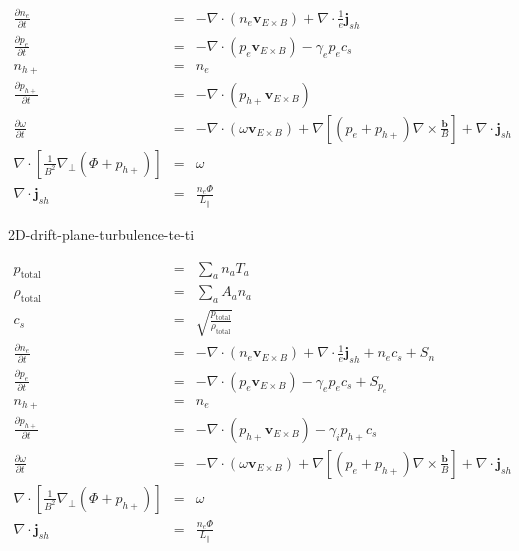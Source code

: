 \begin{eqnarray}
\frac{\partial n_e}{\partial t} &=& - \nabla\cdot\left(n_e\mathbf{v}_{E\times 
B}\right) + \nabla\cdot{\frac{1}{e}\mathbf{j}_{sh}} \\ \frac{\partial 
p_e}{\partial t} &=& - \nabla\cdot\left(p_e\mathbf{v}_{E\times B}\right) - 
\gamma_e p_e c_s \\ n_{h+} &=& n_e \\ \frac{\partial p_{h+}}{\partial t} &=& - 
\nabla\cdot\left(p_{h+}\mathbf{v}_{E\times B}\right) \\ \frac{\partial 
\omega}{\partial t} &=& - \nabla\cdot\left(\omega\mathbf{v}_{E\times B}\right) 
+ \nabla\left[\left(p_e + p_{h+}\right)\nabla\times\frac{\mathbf{b}}{B}\right] 
+ \nabla\cdot\mathbf{j}_{sh} \\ 
\nabla\cdot\left[\frac{1}{B^2}\nabla_\perp\left(\Phi + p_{h+}\right)\right] &=& 
\omega \\ \nabla\cdot{\mathbf{j}_{sh}} &=& \frac{n_e\Phi}{L_{\|}}
\end{eqnarray}

2D-drift-plane-turbulence-te-ti

\begin{eqnarray}
p_\mathrm{total} &=& \sum_a n_a T_a \\ \rho_\mathrm{total} &=& \sum_a A_a n_a \\
c_s &=& \sqrt{\frac{p_\mathrm{total}}{\rho_\mathrm{total}}} \\ 
\frac{\partial n_e}{\partial t} &=& - \nabla\cdot\left(n_e\mathbf{v}_{E\times 
B}\right) + \nabla\cdot{\frac{1}{e}\mathbf{j}_{sh}} + n_e c_s + S_n \\ 
\frac{\partial p_e}{\partial t} &=& - \nabla\cdot\left(p_e\mathbf{v}_{E\times 
B}\right) - \gamma_e p_e c_s + S_{p_e} \\
n_{h+} &=& n_e \\
\frac{\partial p_{h+}}{\partial t} &=& - \nabla\cdot\left(p_{h+}\mathbf{v}_{E\times B}\right) 
- \gamma_i p_{h+} c_s \\
\frac{\partial \omega}{\partial t} &=& 
-\nabla\cdot\left(\omega\mathbf{v}_{E\times B}\right) + \nabla\left[\left(p_e + 
p_{h+}\right)\nabla\times\frac{\mathbf{b}}{B}\right] + \nabla\cdot\mathbf{j}_{sh} \\ 
\nabla\cdot\left[\frac{1}{B^2}\nabla_\perp\left(\Phi + p_{h+}\right)\right] &=& \omega \\
\nabla\cdot{\mathbf{j}_{sh}} &=& \frac{n_e\Phi}{L_{\|}}
\end{eqnarray}

